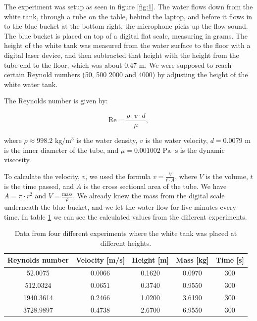 \documentclass[english,a4paper,12pt]{article}
\begin{document}
The experiment was setup as seen in figure \ref{fig:1}. The water flows down from the white tank, through a tube on the table, behind the laptop, and before it flows in to the blue bucket at the bottom right, the microphone picks up the flow sound. The blue bucket is placed on top of a digital flat scale, measuring in grams. The height of the white tank was measured from the water surface to the floor with a digital laser device, and then subtracted that height with the height from the tube end to the floor, which was about 0.47 m. We were supposed to reach certain Reynold numbers (50, 500 2000 and 4000) by adjusting the height of the white water tank. \bigskip


The Reynolds number is given by:

$$\text{Re} = \frac{\rho \cdot v \cdot d}{\mu},$$

where $\rho \approx 998.2$ kg/m$^3$ is the water density, $v$ is the water velocity, $d = 0.0079$ m is the inner diameter of the tube, and $\mu = 0.001002 \text{ Pa} \cdot \text{s}$ is the dynamic viscosity. \smallskip

To calculate the velocity, $v$, we used the formula $v=\frac{V}{t\cdot A}$, where $V$ is the volume, $t$ is the time passed, and $A$ is the cross sectional area of the tube. We have $A=\pi \cdot r^2$ and $V=\frac{\text{mass}}{\rho}$. We already knew the mass from the digital scale underneath the blue bucket, and we let the water flow for five minutes every time. In table \ref{tab:1} we can see the calculated values from the different experiments.

\begin{table}[h!]
    \centering
    \begin{tabular}{|c|c|c|c|c|}\hline
    Reynolds number & Velocity [m/s] & Height [m] & Mass [kg] & Time [s] \\ \hline
    52.0075 & 0.0066 & 0.1620 & 0.0970 & 300\\ \hline
    512.0324 & 0.0651 & 0.3740 & 0.9550 & 300\\ \hline
    1940.3614 & 0.2466 & 1.0200 & 3.6190 & 300\\ \hline
    3728.9897 & 0.4738 & 2.6700 & 6.9550 & 300\\ \hline
    \end{tabular}
    \caption{Data from four different experiments where the white tank was placed at different heights.}
    \label{tab:1}
\end{table}
\end{document}
